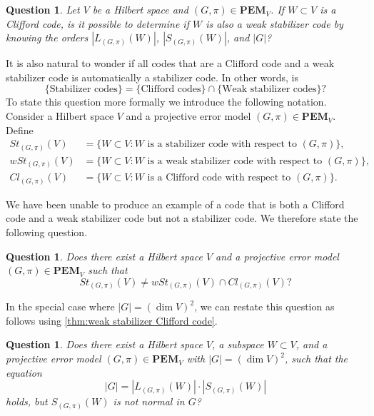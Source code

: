 \documentclass[11pt, oneside, reqno]{amsart}
\newcommand{\PEM}{\mathbf{PEM}}
\theoremstyle{definition}
\theoremstyle{plain}
\newtheorem{question}[definition]{Question}
\theoremstyle{remark}
\begin{document}
\begin{question}\label{Q1}
    Let $V$ be a Hilbert space and $(G,\pi) \in \PEM_V$. If $W \subset V$ is a Clifford code, is it possible to determine if $W$ is also a weak stabilizer code by knowing the orders $|L_{(G,\pi)}(W)|$, $|S_{(G,\pi)}(W)|$, and $|G|$?
\end{question}

It is also natural to wonder if all codes that are a Clifford code and a weak stabilizer code is automatically a stabilizer code. In other words, is
\begin{equation*}
    \{\text{Stabilizer codes}\} = \{\text{Clifford codes}\} \cap \{\text{Weak stabilizer codes}\}?
\end{equation*}
To state this question more formally we introduce the following notation. Consider a Hilbert space $V$ and a projective error model $(G,\pi) \in \PEM_V$. Define 
\begin{align*}
    St_{(G,\pi)}(V) & = \{ W \subset V : W \text{ is a stabilizer code with respect to } (G,\pi) \}, \\
    wSt_{(G,\pi)}(V) & = \{ W \subset V : W \text{ is a weak stabilizer code with respect to } (G,\pi) \}, \\
    Cl_{(G,\pi)}(V) & = \{ W \subset V : W \text{ is a Clifford code with respect to } (G,\pi) \}.
\end{align*}

We have been unable to produce an example of a code that is both a Clifford code and a weak stabilizer code but not a stabilizer code. We therefore state the following question.

\begin{question}\label{Q2}
    Does there exist a Hilbert space $V$ and a projective error model $(G,\pi) \in \PEM_V$ such that
    \begin{equation*}
        St_{(G,\pi)}(V) \neq wSt_{(G,\pi)}(V) \cap Cl_{(G,\pi)}(V)?
    \end{equation*}
\end{question}

In the special case where $|G| = (\dim V)^2$, we can restate this question as follows using \cref{thm:weak stabilizer Clifford code}.

\begin{question}\label{Q3}
    Does there exist a Hilbert space $V$, a subspace $W \subset V$, and a projective error model $(G,\pi) \in \PEM_V$ with $|G| = (\dim V)^2$, such that the equation
    \begin{equation*}
        |G| = |L_{(G,\pi)}(W)|\cdot|S_{(G,\pi)}(W)|
    \end{equation*}
    holds, but $S_{(G,\pi)}(W)$ is not normal in $G$?
\end{question}
\end{document}
